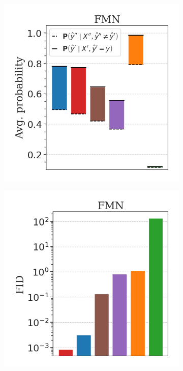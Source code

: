 \begin{figure}[H]
    \begin{subfigure}[b]{0.3\textwidth}
        \centering
        \includegraphics[width=\textwidth]{img/results_discussion/adversarial/DIFF_FMN.png}
    \end{subfigure}
    \hfill
    \begin{subfigure}[b]{0.3\textwidth}
        \centering
        \includegraphics[width=\textwidth]{img/results_discussion/adversarial/FID_barplot_FMN.png}

\end{subfigure}
\end{figure}
